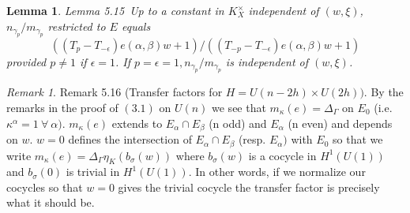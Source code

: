 \documentclass{memo-l}
\newtheorem{lemma}[theorem]{Lemma}
\theoremstyle{definition}
\theoremstyle{remark}
\newtheorem{remark}[theorem]{Remark}
\numberwithin{section}{chapter}
\numberwithin{equation}{chapter}
\begin{document}
\medpagebreak

\begin{lemma}{Lemma 5.15}\ Up to a constant in $K_X^{\times}$ independent of
$(w,{\xi})$, $ n_{{\gamma_p}} /m_{{\gamma_p}}$ restricted to $E$ equals
$$
((T_{p}-T_{-{\epsilon}})e({\alpha},{\beta})w+1)/((T_{-p}-T_{-{\epsilon}})e({\alpha},{\beta})w+1)
$$
provided $p \ne  1$ if ${\epsilon}  =  1$.  If $p = {\epsilon} = 1,
n_{{\gamma_p}}/m_{{\gamma_p}}$ is independent of $(w,{\xi})$.
\end{lemma}

\begin{remark}{Remark  5.16} (Transfer factors for $H  =  U(n-2h) \times U(2h))$.  By
the remarks in the proof of $(3.1)$ on $U(n)$ we see that
$m_{{\kappa}}(e) = {\Delta}_{{\Gamma}}$ on $E_{0}$ (i.e.
${\kappa}^{{\alpha}}  =  1 {\ \forall\ } {\alpha})$.  $m_{{\kappa}}(e)$
extends to $E_{{\alpha}} {\cap} E_{{\beta}}$ (n odd) and $E_{{\alpha}}$ (n
even) and depends on $w$.  $w = 0$ defines the intersection of $E_{{\alpha}}
{\cap} E_{{\beta}}$ (resp.  $E_{{\alpha}})$ with $E_{0}$ so that we write
$m_{{\kappa}}(e) = {\Delta}_{{\Gamma}}{\eta}_{K}(b_{{\sigma}}(w))$ where
$b_{{\sigma}}(w)$ is a cocycle in $H^{1}(U(1))$ and $b_{{\sigma}}(0)$ is
trivial in $H^{1}(U(1))$.  In other words, if we normalize our cocycles so
that $w = 0$ gives the trivial cocycle the transfer factor is precisely what
it should be.
\end{remark}
\end{document}
